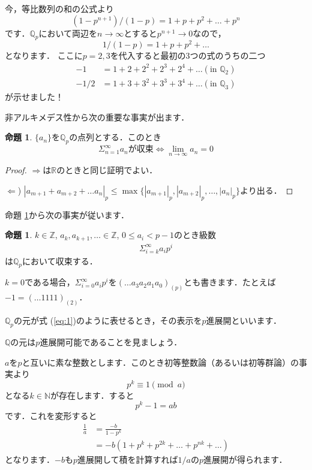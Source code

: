 \documentclass[uplatex]{jsarticle}
\newcommand{\Z}{\mathbb{Z}}
\newcommand{\Q}{\mathbb{Q}}
\newcommand{\R}{\mathbb{R}}
\theoremstyle{definition} %
\newtheorem{prop}[thm]{命題}
\begin{document}
今，等比数列の和の公式より
\[(1-p^{n+1}) / (1-p) = 1 + p + p^2 + \dots + p^n\]
です．$\Q_p$において両辺を$n \to \infty$とすると$p^{n+1} \to 0$なので，
\[1 / (1-p) = 1 + p + p^2 + \dots\]
となります．
ここに$p = 2, 3$を代入すると最初の3つの式のうちの二つ
\begin{align*}
-1 &= 1 + 2 + 2^2 + 2^3 + 2^4 + \dots (\text{in } \Q_2) \\
-1/2 &= 1 + 3 + 3^2 + 3^3 + 3^4 + \dots (\text{in } \Q_3)
\end{align*}
が示せました！

非アルキメデス性から次の重要な事実が出ます．

\begin{oframed}\begin{prop}\label{prop:3}
$\{a_n\}$を$\Q_p$の点列とする．このとき
\[\Sigma_{n=1}^\infty a_n が収束 \iff \lim_{n\to\infty} a_n = 0\]
\end{prop}\end{oframed}
\begin{proof}
$\Rightarrow$は$\R$のときと同じ証明でよい．

$\Leftarrow$) $|a_{m+1} + a_{m+2} + \dots a_n|_p \leq \max\{|a_{m+1}|_p,  |a_{m+2}|_p, \dots, |a_n|_p\}$より出る．
\end{proof}

命題 \ref{prop:3}から次の事実が従います．

\begin{oframed}\begin{prop}
$k \in \Z$, $a_k, a_{k+1}, \dots \in \Z$, $0 \le a_i < p-1$のとき級数
\begin{align}
\Sigma_{i=k}^\infty a_i p^i \label{eq:1}
\end{align}
は$\Q_p$において収束する．
\end{prop}\end{oframed}

$k=0$である場合，$\Sigma_{i=0}^\infty a_i p^i$を$(\dots a_3 a_2 a_1 a_0)_{(p)}$とも書きます．たとえば $-1 = (\dots 1 1 1 1)_{(2)}$．

$\Q_p$の元が式 (\ref{eq:1})のように表せるとき，その表示を$p$進展開といいます．

$\Q$の元は$p$進展開可能であることを見ましょう．

$a$を$p$と互いに素な整数とします．このとき初等整数論（あるいは初等群論）の事実より
\[p^k \equiv 1 \pmod a\]
となる$k \in \mathbb{N}$が存在します．すると
\[p^k-1 = ab\]
です．これを変形すると
\begin{align*}
\frac{1}{a} &= \frac{-b}{1-p^k} \\
&= -b(1+p^k+p^{2k}+\dots+p^{nk}+\dots)
\end{align*}
となります．$-b$も$p$進展開して積を計算すれば$1/a$の$p$進展開が得られます．
\end{document}

